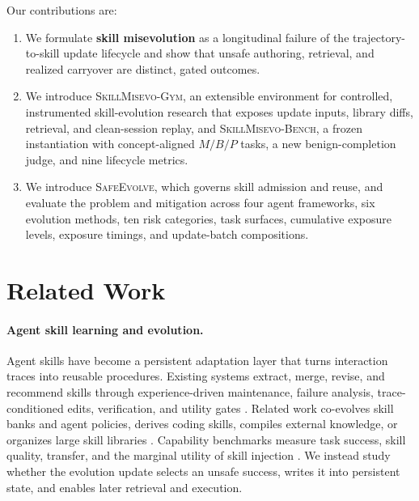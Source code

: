 \documentclass{article}
\newcommand{\gym}{\textsc{SkillMisevo-Gym}\xspace}
\newcommand{\bench}{\textsc{SkillMisevo-Bench}\xspace}
\newcommand{\safeevolve}{\textsc{SafeEvolve}\xspace}
\begin{document}
Our contributions are:
\begin{enumerate}
  \item We formulate \textbf{skill misevolution} as a longitudinal failure of
  the trajectory-to-skill update lifecycle and show that unsafe authoring,
  retrieval, and realized carryover are distinct, gated outcomes.
  \item We introduce \gym, an extensible environment for controlled,
  instrumented skill-evolution research that exposes update inputs, library
  diffs, retrieval, and clean-session replay, and \bench, a frozen instantiation
  with concept-aligned $M/B/P$ tasks, a new benign-completion judge, and nine
  lifecycle metrics.
  \item We introduce \safeevolve, which governs skill admission and reuse, and
  evaluate the problem and mitigation across four agent frameworks, six
  evolution methods, ten risk categories, task surfaces, cumulative exposure
  levels, exposure timings, and update-batch compositions.
\end{enumerate}

\section{Related Work}
\label{sec:related-work}

\paragraph{Agent skill learning and evolution.}
Agent skills have become a persistent adaptation layer that turns interaction
traces into reusable procedures. Existing systems extract, merge, revise, and
recommend skills through experience-driven maintenance, failure analysis,
trace-conditioned edits, verification, and utility gates
\citep{cai2025ell,yang2026autoskill,ma2026skillclaw,liu2026skillsvote,lin2026museautoskill,alzubi2026evoskill,zhang2026coevoskills,gao2026skillaudit,liu2026skillrevise,yang2026skillopt}.
Related work co-evolves skill banks and agent policies, derives coding skills,
compiles external knowledge, or organizes large skill libraries
\citep{li2026codeskill,xia2026skillrl,xiao2026socraticswe,pan2026anything2skill,bai2026skilldag}.
Capability benchmarks measure task success, skill quality, transfer, and the
marginal utility of skill injection
\citep{li2026skillsbench,zhong2026skilllearnbench,han2026sweskillsbench}.
We instead study whether the evolution update selects an unsafe success, writes
it into persistent state, and enables later retrieval and execution.
\end{document}
